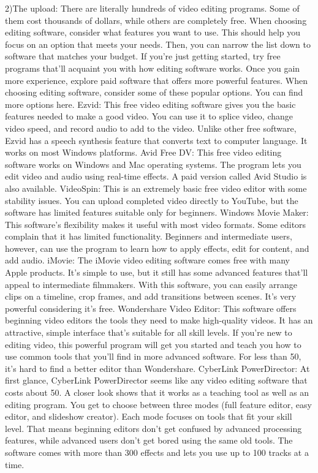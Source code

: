 2)The upload:
There are literally hundreds of video editing programs. Some of them cost thousands of dollars, while others are completely free. When choosing editing software, consider what features you want to use. This should help you focus on an option that meets your needs. Then, you can narrow the list down to software that matches your budget.
If you're just getting started, try free programs that'll acquaint you with how editing software works. Once you gain more experience, explore paid software that offers more powerful features.
When choosing editing software, consider some of these popular options. You can find more options here.
Ezvid: This free video editing software gives you the basic features needed to make a good video. You can use it to splice video, change video speed, and record audio to add to the video. Unlike other free software, Ezvid has a speech synthesis feature that converts text to computer language. It works on most Windows platforms.
Avid Free DV: This free video editing software works on Windows and Mac operating systems. The program lets you edit video and audio using real-time effects. A paid version called Avid Studio is also available.
VideoSpin: This is an extremely basic free video editor with some stability issues. You can upload completed video directly to YouTube, but the software has limited features suitable only for beginners.
Windows Movie Maker: This software's flexibility makes it useful with most video formats. Some editors complain that it has limited functionality. Beginners and intermediate users, however, can use the program to learn how to apply effects, edit for content, and add audio.
iMovie: The iMovie video editing software comes free with many Apple products. It's simple to use, but it still has some advanced features that'll appeal to intermediate filmmakers. With this software, you can easily arrange clips on a timeline, crop frames, and add transitions between scenes. It's very powerful considering it's free.
Wondershare Video Editor: This software offers beginning video editors the tools they need to make high-quality videos. It has an attractive, simple interface that's suitable for all skill levels. If you're new to editing video, this powerful program will get you started and teach you how to use common tools that you'll find in more advanced software. For less than 50, it's hard to find a better editor than Wondershare.
CyberLink PowerDirector: At first glance, CyberLink PowerDirector seems like any video editing software that costs about 50. A closer look shows that it works as a teaching tool as well as an editing program. You get to choose between three modes   (full feature editor, easy editor, and slideshow creator). Each mode focuses on tools that fit your skill level. That means beginning editors don't get confused by advanced processing features, while advanced users don't get bored using the same old tools. The software comes with more than 300 effects and lets you use up to 100 tracks at a time.
